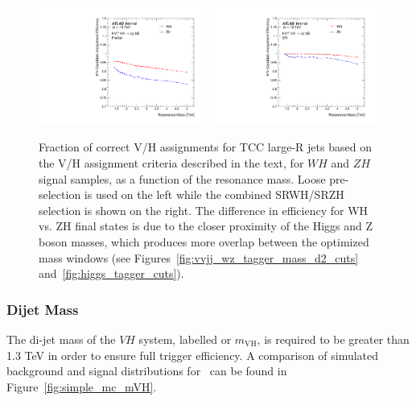 \begin{figure}[htbp!]
\begin{center}
\includegraphics[width=0.49\textwidth]{VHqqbb_HVCandAssignEff_presel.pdf}
\includegraphics[width=0.49\textwidth]{VHqqbb_HVCandAssignEff_SR.pdf}
\end{center}
\caption{
Fraction of correct V/H assignments for TCC large-R jets based on the V/H assignment criteria described in the text, for $WH$ and $ZH$ signal samples, as a function of the resonance mass.
Loose pre-selection is used on the left while the combined SRWH/SRZH selection is shown on the right.
The difference in efficiency for WH vs. ZH final states is due to the closer proximity of the Higgs and Z boson masses, which produces more overlap between the optimized mass windows (see Figures~\ref{fig:vvjj_wz_tagger_mass_d2_cuts} and~\ref{fig:higgs_tagger_cuts}).
}
\label{fig:assignment}
\end{figure}

\subsubsection{Dijet Mass}
The di-jet mass of the $VH$ system, labelled \mvh or $m_{\mathrm{VH}}$, is required to be greater than 1.3 TeV in order to ensure full trigger efficiency.
A comparison of simulated background and signal distributions for \mvh\ can be found in Figure~\ref{fig:simple_mc_mVH}.

